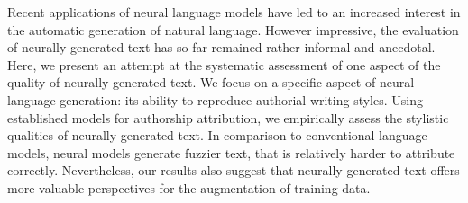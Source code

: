 Recent applications of neural language models have led to an increased interest in the automatic generation of natural language. However impressive, the evaluation of neurally generated text has so far remained rather informal and anecdotal. Here, we present an attempt at the systematic assessment of one aspect of the quality of neurally generated text. We focus on a specific aspect of neural language generation: its ability to reproduce authorial writing styles. Using established models for authorship attribution, we empirically assess the stylistic qualities of neurally generated text. In comparison to conventional language models, neural models generate fuzzier text, that is relatively harder to attribute correctly. Nevertheless, our results also suggest that neurally generated text offers more valuable perspectives for the augmentation of training data.
